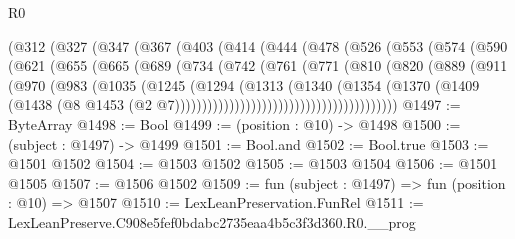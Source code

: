 \begin{lexlean}{R0}
\begin{coremodule}
            (@312
              (@327
                (@347
                  (@367
                    (@403
                      (@414
                        (@444
                          (@478
                            (@526
                              (@553
                                (@574
                                  (@590
                                    (@621
                                      (@655
                                        (@665
                                          (@689
                                            (@734
                                              (@742
                                                (@761
                                                  (@771
                                                    (@810
                                                      (@820
                                                        (@889
                                                          (@911
                                                            (@970
                                                              (@983
                                                                (@1035
                                                                  (@1245
                                                                    (@1294
                                                                      (@1313
                                                                        (@1340
                                                                          (@1354
                                                                            (@1370
                                                                              (@1409
                                                                                (@1438
                                                                                  (@8
                                                                                    @1453
                                                                                    (@2
                                                                                      @7)))))))))))))))))))))))))))))))))))))))))
@1497 := ByteArray
@1498 := Bool
@1499 := (position : @10) -> @1498
@1500 := (subject : @1497) -> @1499
@1501 := Bool.and
@1502 := Bool.true
@1503 := @1501 @1502
@1504 := @1503 @1502
@1505 := @1503 @1504
@1506 := @1501 @1505
@1507 := @1506 @1502
@1509 := fun (subject : @1497) => fun (position : @10) => @1507
@1510 := LexLeanPreservation.FunRel
@1511 := LexLeanPreserve.C908e5fef0bdabc2735eaa4b5c3f3d360.R0.__prog

\end{coremodule}
\end{lexlean}
